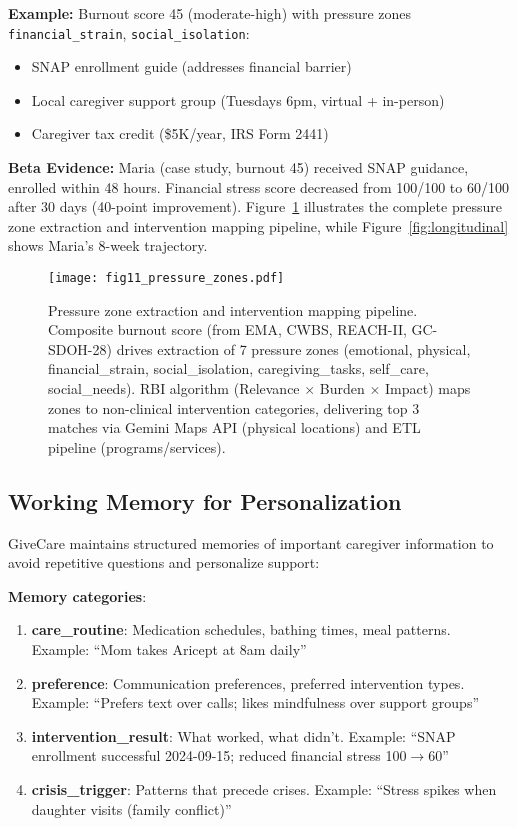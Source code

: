\documentclass{article}
\begin{document}
\textbf{Example:} Burnout score 45 (moderate-high) with pressure zones \texttt{financial\_strain}, \texttt{social\_isolation}:
\begin{itemize}
    \item SNAP enrollment guide (addresses financial barrier)
    \item Local caregiver support group (Tuesdays 6pm, virtual + in-person)
    \item Caregiver tax credit (\$5K/year, IRS Form 2441)
\end{itemize}

\textbf{Beta Evidence:} Maria (case study, burnout 45) received SNAP guidance, enrolled within 48 hours. Financial stress score decreased from 100/100 to 60/100 after 30 days (40-point improvement). Figure~\ref{fig:pressure_zones} illustrates the complete pressure zone extraction and intervention mapping pipeline, while Figure~\ref{fig:longitudinal} shows Maria's 8-week trajectory.

%
\begin{figure}[htbp]%
\centering%
\texttt{[image: fig11\_pressure\_zones.pdf]}%
\caption{Pressure zone extraction and intervention mapping pipeline. Composite burnout score (from EMA, CWBS, REACH-II, GC-SDOH-28) drives extraction of 7 pressure zones (emotional, physical, financial\_strain, social\_isolation, caregiving\_tasks, self\_care, social\_needs). RBI algorithm (Relevance $\times$ Burden $\times$ Impact) maps zones to non-clinical intervention categories, delivering top 3 matches via Gemini Maps API (physical locations) and ETL pipeline (programs/services).}%
\label{fig:pressure_zones}%
\end{figure}%
\subsection{Working Memory for Personalization}%
\label{subsec:WorkingMemoryforPersonalization}%
GiveCare maintains structured memories of important caregiver information to avoid repetitive questions and personalize support:

\textbf{Memory categories}:
\begin{enumerate}
    \item \textbf{care\_routine}: Medication schedules, bathing times, meal patterns. Example: ``Mom takes Aricept at 8am daily''
    \item \textbf{preference}: Communication preferences, preferred intervention types. Example: ``Prefers text over calls; likes mindfulness over support groups''
    \item \textbf{intervention\_result}: What worked, what didn't. Example: ``SNAP enrollment successful 2024-09-15; reduced financial stress 100$\rightarrow$60''
    \item \textbf{crisis\_trigger}: Patterns that precede crises. Example: ``Stress spikes when daughter visits (family conflict)''
\end{enumerate}
\end{document}
